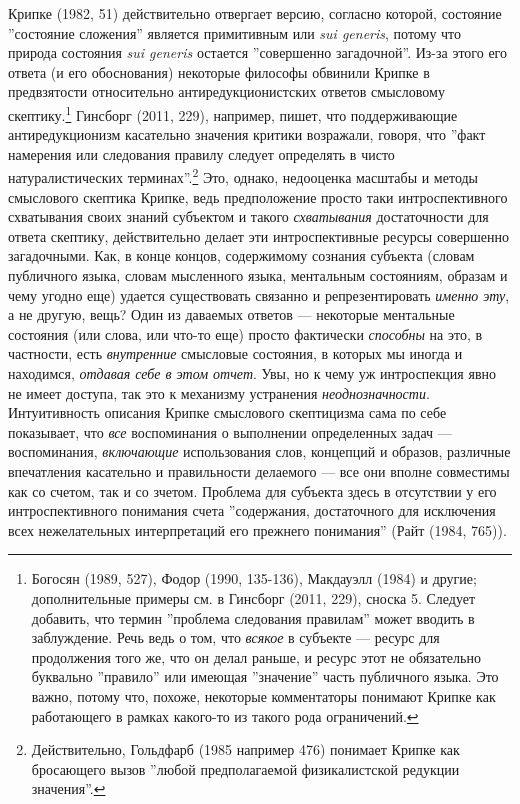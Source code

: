 \documentclass[11pt]{book}
\begin{document}
Крипке (1982, 51) действительно отвергает версию, согласно которой, состояние ''состояние сложения'' является примитивным или \textit{sui generis}, потому что природа состояния \textit{sui generis} остается ''совершенно загадочной''. Из-за этого его ответа (и его обоснования) некоторые философы обвинили Крипке в предвзятости относительно антиредукционистских ответов смысловому скептику.\footnote{Богосян (1989, 527), Фодор (1990, 135-136), Макдауэлл (1984) и другие; дополнительные примеры см. в Гинсборг (2011, 229), сноска 5. Следует добавить, что термин ''проблема следования правилам'' может вводить в заблуждение. Речь ведь о том, что \textit{всякое} в субъекте --- ресурс для продолжения того же, что он делал раньше, и ресурс этот не обязательно буквально ''правило'' или имеющая ''значение'' часть публичного языка. Это важно, потому что, похоже, некоторые комментаторы понимают Крипке как работающего в рамках какого-то из такого рода ограничений.} Гинсборг (2011, 229), например, пишет, что поддерживающие антиредукционизм касательно значения критики возражали, говоря, что ''факт намерения или следования правилу следует определять в чисто натуралистических терминах''.\footnote{Действительно, Гольдфарб (1985 например 476) понимает Крипке как бросающего вызов ''любой предполагаемой физикалистской редукции значения''.} Это, однако, недооценка масштабы и методы смыслового скептика Крипке, ведь предположение просто таки интроспективного схватывания своих знаний субъектом и такого \textit{схватывания} достаточности для ответа скептику, действительно делает эти интроспективные ресурсы совершенно загадочными. Как, в конце концов, содержимому сознания субъекта (словам публичного языка, словам мысленного языка, ментальным состояниям, образам и чему угодно еще) удается существовать связанно и репрезентировать \textit{именно эту}, а не другую, вещь? Один из даваемых ответов --- некоторые ментальные состояния (или слова, или что-то еще) просто фактически \textit{способны} на это, в частности, есть \textit{внутренние} смысловые состояния, в которых мы иногда и находимся, \textit{отдавая себе в этом отчет}. Увы, но к чему уж интроспекция явно не имеет доступа, так это к механизму устранения \textit{неоднозначности}. Интуитивность описания Крипке смыслового скептицизма сама  по себе показывает, что \textit{все} воспоминания о выполнении определенных задач --- воспоминания, \textit{включающие} использования слов, концепций и образов, различные впечатления касательно  и правильности делаемого --- все они вполне совместимы как со счетом, так и со зчетом. Проблема для субъекта здесь в отсутствии у его интроспективного понимания счета ''содержания, достаточного для исключения всех нежелательных интерпретаций его прежнего понимания'' (Райт (1984, 765)).
\end{document}
